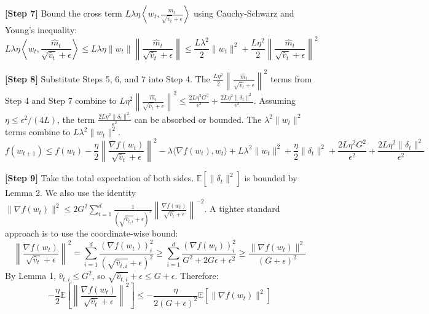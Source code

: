 \documentclass{article}
\begin{document}
\textbf{[Step 7]} Bound the cross term $L \lambda \eta \left\langle w_t, \frac{\hat{m}_t}{\sqrt{\hat{v}_t} + \epsilon} \right\rangle$ using Cauchy-Schwarz and Young's inequality:
$$ L \lambda \eta \left\langle w_t, \frac{\hat{m}_t}{\sqrt{\hat{v}_t} + \epsilon} \right\rangle \leq L \lambda \eta \|w_t\| \left\| \frac{\hat{m}_t}{\sqrt{\hat{v}_t} + \epsilon} \right\| \leq \frac{L \lambda^2}{2} \|w_t\|^2 + \frac{L \eta^2}{2} \left\| \frac{\hat{m}_t}{\sqrt{\hat{v}_t} + \epsilon} \right\|^2 $$

\textbf{[Step 8]} Substitute Steps 5, 6, and 7 into Step 4. The $\frac{L \eta^2}{2} \left\| \frac{\hat{m}_t}{\sqrt{\hat{v}_t} + \epsilon} \right\|^2$ terms from Step 4 and Step 7 combine to $L \eta^2 \left\| \frac{\hat{m}_t}{\sqrt{\hat{v}_t} + \epsilon} \right\|^2 \leq \frac{2 L \eta^2 G^2}{\epsilon^2} + \frac{2 L \eta^2 \|\delta_t\|^2}{\epsilon^2}$. Assuming $\eta \leq \epsilon^2 / (4L)$, the term $\frac{2 L \eta^2 \|\delta_t\|^2}{\epsilon^2}$ can be absorbed or bounded. The $\lambda^2 \|w_t\|^2$ terms combine to $L \lambda^2 \|w_t\|^2$.
$$ f(w_{t+1}) \leq f(w_t) - \frac{\eta}{2} \left\| \frac{\nabla f(w_t)}{\sqrt{\hat{v}_t} + \epsilon} \right\|^2 - \lambda \langle \nabla f(w_t), w_t \rangle + L \lambda^2 \|w_t\|^2 + \frac{\eta}{2} \|\delta_t\|^2 + \frac{2 L \eta^2 G^2}{\epsilon^2} + \frac{2 L \eta^2 \|\delta_t\|^2}{\epsilon^2} $$

\textbf{[Step 9]} Take the total expectation of both sides. $\mathbb{E}[\|\delta_t\|^2]$ is bounded by Lemma 2. We also use the identity $\|\nabla f(w_t)\|^2 \leq 2 G^2 \sum_{i=1}^d \frac{1}{(\sqrt{\hat{v}_{t,i}} + \epsilon)^2} \left\| \frac{\nabla f(w_t)}{\sqrt{\hat{v}_t} + \epsilon} \right\|^{-2}$. A tighter standard approach is to use the coordinate-wise bound:
$$ \left\| \frac{\nabla f(w_t)}{\sqrt{\hat{v}_t} + \epsilon} \right\|^2 = \sum_{i=1}^d \frac{(\nabla f(w_t))_i^2}{(\sqrt{\hat{v}_{t,i}} + \epsilon)^2} \geq \sum_{i=1}^d \frac{(\nabla f(w_t))_i^2}{G^2 + 2 G \epsilon + \epsilon^2} \geq \frac{\|\nabla f(w_t)\|^2}{(G+\epsilon)^2} $$
By Lemma 1, $\hat{v}_{t,i} \leq G^2$, so $\sqrt{\hat{v}_{t,i}} + \epsilon \leq G + \epsilon$. Therefore:
$$ -\frac{\eta}{2} \mathbb{E}\left[ \left\| \frac{\nabla f(w_t)}{\sqrt{\hat{v}_t} + \epsilon} \right\|^2 \right] \leq -\frac{\eta}{2(G+\epsilon)^2} \mathbb{E}[\|\nabla f(w_t)\|^2] $$
\end{document}
